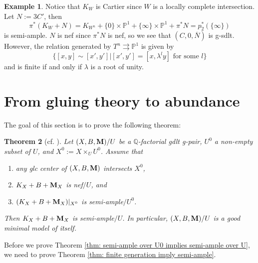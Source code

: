 \documentclass[11pt]{amsart}
\numberwithin{equation}{section}
\newcommand{\Mm}{{\bf{M}}}
\newcommand{\Pp}{\mathbb{P}}
\newtheorem{thm}{Theorem}[section]
\theoremstyle{definition}
\theoremstyle{definition}
\newtheorem{ex}[thm]{Example}
\theoremstyle{definition}
\begin{document}
\begin{ex}
  Notice that $K_W$ is Cartier since $W$ is a locally complete
  intersection. Let $N:=3C'$, then
  $$\pi^*(K_W+N)=K_{W^n}+\{0\}\times\Pp^1+\{\infty\}\times\Pp^1+\pi^*N=p_2^*(\{\infty\})$$
  is semi-ample. $N$ is nef since $\pi^*N$ is nef, so we see that
  $(C,0,\overline{N})$ is g-sdlt. However, the relation generated by
  $T^n\rightrightarrows\Pp^1$ is given by
  $$\{[x,y]\sim[x',y']|[x',y']=[x,\lambda^ly] \text{ for some $l$}\}$$
  and is finite if and only if $\lambda$ is a root of unity.
\end{ex}

\section{From gluing theory to abundance}\label{sec: key theorem}
The goal of this section is to prove the following theorem:

\begin{thm}[{cf. \cite[Theorem 4.1]{HX13}}]\label{thm: semi-ample
  over U0 implies semi-ample over U}
  Let $(X,B,\Mm)/U$ be a $\mathbb Q$-factorial gdlt g-pair, $U^0$ a
  non-empty subset of $U$, and $X^0:=X\times_UU^0$. Assume that
  \begin{enumerate}
    \item any glc center of $(X,B,\Mm)$ intersects $X^0$,
    \item $K_X+B+\Mm_X$ is nef$/U$, and
    \item $(K_X+B+\Mm_X)|_{X^0}$ is semi-ample$/U^0$.
  \end{enumerate}
  Then $K_X+B+\Mm_X$ is semi-ample$/U$. In particular, $(X,B,\Mm)/U$
  is a good minimal model of itself.
\end{thm}

Before we prove Theorem \ref{thm: semi-ample over U0 implies
semi-ample over U}, we need to prove Theorem \ref{thm: finite
generation imply semi-ample}.
\end{document}
